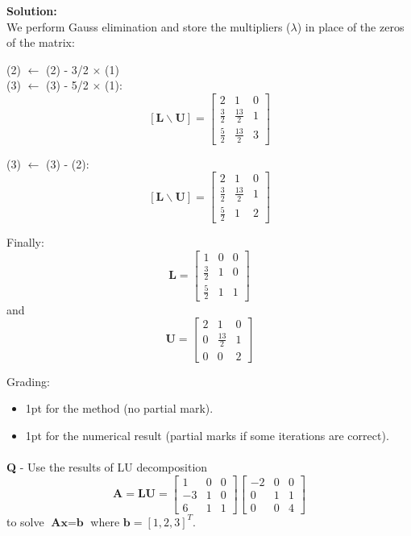 \documentclass{llncs}
\newcounter{ques}
\renewcommand{\question}[1]{\paragraph{}\textbf{Q\theques} - #1\stepcounter{ques} }
\newcommand{\answer}[1]{\color{red}\textbf{Solution:}\\#1\color{black}}
\begin{document}
\answer{
We perform Gauss elimination and store the multipliers ($\lambda$) in place
of the zeros of the matrix:

\noindent (2) $\leftarrow$ (2) - 3/2 $\times$ (1)\\
(3) $\leftarrow$ (3) - 5/2 $\times$ (1):
$$
\left[ \textbf{L} \backslash \textbf{U} \right] = 
\begin{bmatrix}
2 & 1 & 0 \\
\frac{3}{2} & \frac{13}{2} & 1 \\
\frac{5}{2} & \frac{13}{2} & 3
\end{bmatrix}
$$

\noindent (3) $\leftarrow$ (3) - (2):
$$
\left[ \textbf{L} \backslash \textbf{U} \right] = 
\begin{bmatrix}
2 & 1 & 0 \\
\frac{3}{2} & \frac{13}{2} & 1 \\
\frac{5}{2} & 1 & 2
\end{bmatrix}
$$

Finally:
$$
\textbf{L} =
\begin{bmatrix}
1 & 0 & 0 \\
\frac{3}{2} & 1 & 0 \\
\frac{5}{2} & 1 & 1
\end{bmatrix}
$$
and
$$
\textbf{U} = 
\begin{bmatrix}
2 & 1 & 0 \\
0 & \frac{13}{2} & 1 \\
0 & 0 & 2
\end{bmatrix}
$$

Grading:
\begin{itemize}
\item 1pt for the method (no partial mark).
\item 1pt for the numerical result (partial marks if some iterations are correct).
\end{itemize}
}


\newpage
\question{Use the results of LU decomposition 
$$
\textbf{A}=\textbf{LU}= 
\begin{bmatrix}
1 & 0 & 0 \\
-3 & 1 & 0 \\
6 & 1 & 1
\end{bmatrix}
\begin{bmatrix}
-2 & 0 & 0 \\
0 & 1 & 1 \\
0 & 0 & 4
\end{bmatrix}
$$
to solve $\textbf{Ax}=\textbf{b}$ where $\textbf{b} = [1, 2, 3]^T$.
}
\end{document}

